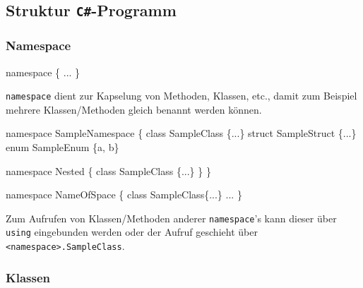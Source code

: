 \documentclass[
  9pt,
  a4paperpaper,
  DIV=11]{scrartcl}
\newenvironment{Shaded}{}{}
\newcommand{\KeywordTok}[1]{\textcolor[rgb]{0.84,0.23,0.29}{#1}}
\newcommand{\NormalTok}[1]{\textcolor[rgb]{0.14,0.16,0.18}{#1}}
\newcommand{\OperatorTok}[1]{\textcolor[rgb]{0.14,0.16,0.18}{#1}}
\numberwithin{equation}{section}
\begin{document}
\begin{multicols}{2}

\hypertarget{struktur-c-programm}{%
\subsection{\texorpdfstring{Struktur
\texttt{C\#}-Programm}{Struktur C\#-Programm}}\label{struktur-c-programm}}

\hypertarget{namespace}{%
\subsubsection{Namespace}\label{namespace}}

\begin{Shaded}
\begin{Highlighting}[]
\KeywordTok{namespace} \OperatorTok{\{} \OperatorTok{...} \OperatorTok{\}}
\end{Highlighting}
\end{Shaded}

\texttt{namespace} dient zur Kapselung von Methoden, Klassen, etc.,
damit zum Beispiel mehrere Klassen/Methoden gleich benannt werden
können.

\begin{Shaded}
\begin{Highlighting}[]
\KeywordTok{namespace}\NormalTok{ SampleNamespace }\OperatorTok{\{}
  \KeywordTok{class}\NormalTok{ SampleClass }\OperatorTok{\{...\}}
  \KeywordTok{struct}\NormalTok{ SampleStruct }\OperatorTok{\{...\}}
  \KeywordTok{enum}\NormalTok{ SampleEnum }\OperatorTok{\{}\NormalTok{a}\OperatorTok{,}\NormalTok{ b}\OperatorTok{\}}

  \KeywordTok{namespace}\NormalTok{ Nested }\OperatorTok{\{}
    \KeywordTok{class}\NormalTok{ SampleClass }\OperatorTok{\{...\}}
  \OperatorTok{\}}
\OperatorTok{\}}

\KeywordTok{namespace}\NormalTok{ NameOfSpace }\OperatorTok{\{}
  \KeywordTok{class}\NormalTok{ SampleClass}\OperatorTok{\{...\}}
  \OperatorTok{...}
\OperatorTok{\}}
\end{Highlighting}
\end{Shaded}

Zum Aufrufen von Klassen/Methoden anderer \texttt{namespace}'s kann
dieser über \texttt{using} eingebunden werden oder der Aufruf geschieht
über \texttt{\textless{}namespace\textgreater{}.SampleClass}.

\hypertarget{klassen}{%
\subsubsection{Klassen}\label{klassen}}


\end{multicols}
\end{document}
